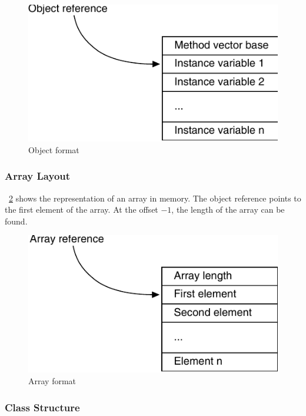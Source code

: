 \begin{figure}
    \centering
    \includegraphics[scale=\picscale]{jvm/jvm_object}
    \caption{Object format}
    \label{fig_jvm_object}
\end{figure}

\subsubsection{Array Layout}

\figurename~\ref{fig_jvm_array} shows the representation of an array
in memory. The object reference points to the first element of the
array. At the offset $-1$, the length of the array can be found.

\begin{figure}
    \centering
    \includegraphics[scale=\picscale]{jvm/jvm_array}
    \caption{Array format}
    \label{fig_jvm_array}
\end{figure}


\subsubsection{Class Structure}

